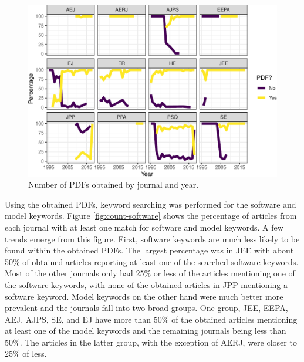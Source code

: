 \documentclass[english,,man]{apa6}
\theoremstyle{definition}
\theoremstyle{definition}
\theoremstyle{definition}
\theoremstyle{remark}
\begin{document}
\begin{figure}
\centering
\includegraphics{software_files/figure-latex/pdf-time-1.pdf}
\caption{\label{fig:pdf-time}Number of PDFs obtained by journal and year.}
\end{figure}

Using the obtained PDFs, keyword searching was performed for the
software and model keywords. Figure \ref{fig:count-software} shows the
percentage of articles from each journal with at least one match for
software and model keywords. A few trends emerge from this figure.
First, software keywords are much less likely to be found within the
obtained PDFs. The largest percentage was in JEE with about 50\% of
obtained articles reporting at least one of the searched software
keywords. Most of the other journals only had 25\% or less of the
articles mentioning one of the software keywords, with none of the
obtained articles in JPP mentioning a software keyword. Model keywords
on the other hand were much better more prevalent and the journals fall
into two broad groups. One group, JEE, EEPA, AEJ, AJPS, SE, and EJ have
more than 50\% of the obtained articles mentioning at least one of the
model keywords and the remaining journals being less than 50\%. The
articles in the latter group, with the exception of AERJ, were closer to
25\% of less.
\end{document}

